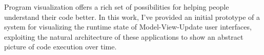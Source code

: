 \documentclass{sigchi}
\begin{document}
Program visualization offers a rich set of possibilities for helping
people understand their code better. In this work, I've provided an
initial prototype of a system for visualizing the runtime state of
Model-View-Update user interfaces, exploiting the natural architecture
of these applications to show an abstract picture of code execution over
time.

%
%
%
%
%
\balance{}

% 
% 

\printbibliography
\end{document}

